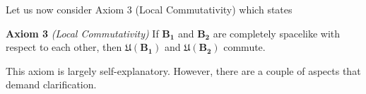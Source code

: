 Let us now consider Axiom 3 (Local Commutativity) which states

\textbf{Axiom 3} \textit{(Local Commutativity)} If $\mathbf{B_1}$ and $\mathbf{B_2}$ are completely spacelike with respect to each other, then $\mathfrak{U}(\mathbf{B_1})$ and $\mathfrak{U}(\mathbf{B_2})$ commute.

This axiom is largely self-explanatory. However, there are a couple of aspects that demand clarification.
